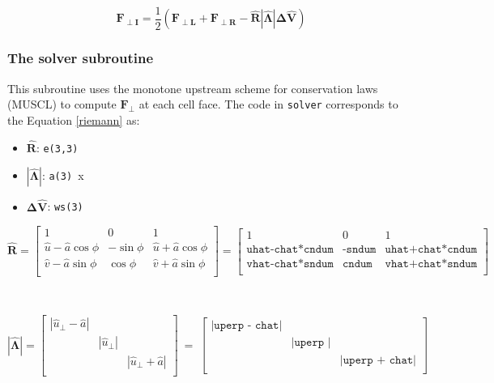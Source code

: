 \documentclass{article}
\newcommand{\code}[1]{\texttt{#1}}
\begin{document}
\begin{equation*}
\mathbf{F_{\perp I}} =
	 \frac{1}{2} (\mathbf{F_{\perp L}} + \mathbf{F_{\perp R}} - \mathbf{\hat{R} |\hat{\Lambda}| \Delta \hat V  })
\end{equation*}


\subsubsection*{The solver subroutine}

This subroutine uses the monotone upstream scheme for conservation laws (MUSCL) to compute $\mathbf{F_\perp}$ at each cell face.  The code in \code{solver} corresponds to the Equation \ref{riemann} as: 

 \begin{itemize}
 	\item $\mathbf{\hat{R}}$: \code{e(3,3)}
 	\item $\mathbf{|\hat{\Lambda}|}$: \code{a(3) }x
 	\item $\mathbf{\Delta \hat V  }  $: \code{ws(3)} 
 \end{itemize}
 
 \[ \mathbf{\hat{R}} = 
\begin{bmatrix}
    1 &  0  & 1  \\
    \hat{u} -\hat{a} \cos{\phi} &   -\sin{\phi} & \hat{u} +\hat{a} \cos{\phi}   \\
    \hat{v} -\hat{a} \sin{\phi} &   \cos{\phi} & \hat{v} +\hat{a} \sin{\phi}    \\
\end{bmatrix} = 
\begin{bmatrix}
    1 &  0  & 1  \\
    \code{uhat-chat*cndum} &    \code{-sndum} &  \code{uhat+chat*cndum} \\
    \code{vhat-chat*sndum} &    \code{cndum} &  \code{vhat+chat*sndum} \\
\end{bmatrix}
\]

\
 
 \[ \mathbf{|\hat{\Lambda}|} = 
\begin{bmatrix}
  |\hat{u}_\perp - \hat a| &  &  \\
     &   |\hat{u}_\perp | &  \\ 
     & &  |\hat{u}_\perp  + \hat a| \\
\end{bmatrix} \ =  \
\begin{bmatrix}
 \code{|uperp - chat|} &  &  \\
     &    \code{|uperp |} &  \\ 
     & &   \code{|uperp + chat|} \\
\end{bmatrix} 
\]
\end{document}
